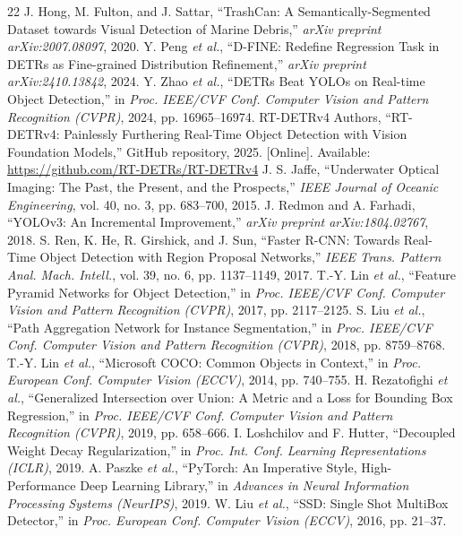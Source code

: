 \documentclass[conference]{IEEEtran}
\begin{document}
\begin{thebibliography}{22}
 J. Hong, M. Fulton, and J. Sattar, ``TrashCan: A Semantically-Segmented Dataset towards Visual Detection of Marine Debris,'' \emph{arXiv preprint arXiv:2007.08097}, 2020.
 Y. Peng \emph{et al.}, ``D-FINE: Redefine Regression Task in DETRs as Fine-grained Distribution Refinement,'' \emph{arXiv preprint arXiv:2410.13842}, 2024.
 Y. Zhao \emph{et al.}, ``DETRs Beat YOLOs on Real-time Object Detection,'' in \emph{Proc. IEEE/CVF Conf. Computer Vision and Pattern Recognition (CVPR)}, 2024, pp. 16965--16974.
 RT-DETRv4 Authors, ``RT-DETRv4: Painlessly Furthering Real-Time Object Detection with Vision Foundation Models,'' GitHub repository, 2025. [Online]. Available: \url{https://github.com/RT-DETRs/RT-DETRv4}
 J. S. Jaffe, ``Underwater Optical Imaging: The Past, the Present, and the Prospects,'' \emph{IEEE Journal of Oceanic Engineering}, vol. 40, no. 3, pp. 683--700, 2015.
 J. Redmon and A. Farhadi, ``YOLOv3: An Incremental Improvement,'' \emph{arXiv preprint arXiv:1804.02767}, 2018.
 S. Ren, K. He, R. Girshick, and J. Sun, ``Faster R-CNN: Towards Real-Time Object Detection with Region Proposal Networks,'' \emph{IEEE Trans. Pattern Anal. Mach. Intell.}, vol. 39, no. 6, pp. 1137--1149, 2017.
 T.-Y. Lin \emph{et al.}, ``Feature Pyramid Networks for Object Detection,'' in \emph{Proc. IEEE/CVF Conf. Computer Vision and Pattern Recognition (CVPR)}, 2017, pp. 2117--2125.
 S. Liu \emph{et al.}, ``Path Aggregation Network for Instance Segmentation,'' in \emph{Proc. IEEE/CVF Conf. Computer Vision and Pattern Recognition (CVPR)}, 2018, pp. 8759--8768.
 T.-Y. Lin \emph{et al.}, ``Microsoft COCO: Common Objects in Context,'' in \emph{Proc. European Conf. Computer Vision (ECCV)}, 2014, pp. 740--755.
 H. Rezatofighi \emph{et al.}, ``Generalized Intersection over Union: A Metric and a Loss for Bounding Box Regression,'' in \emph{Proc. IEEE/CVF Conf. Computer Vision and Pattern Recognition (CVPR)}, 2019, pp. 658--666.
 I. Loshchilov and F. Hutter, ``Decoupled Weight Decay Regularization,'' in \emph{Proc. Int. Conf. Learning Representations (ICLR)}, 2019.
 A. Paszke \emph{et al.}, ``PyTorch: An Imperative Style, High-Performance Deep Learning Library,'' in \emph{Advances in Neural Information Processing Systems (NeurIPS)}, 2019.
 W. Liu \emph{et al.}, ``SSD: Single Shot MultiBox Detector,'' in \emph{Proc. European Conf. Computer Vision (ECCV)}, 2016, pp. 21--37.

\end{thebibliography}
\end{document}

